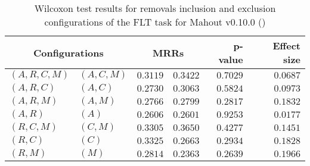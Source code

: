
\begin{table}
\begin{spacing}{1.2}
\centering
\caption{Wilcoxon test results for removals inclusion and exclusion configurations of the FLT task for Mahout v0.10.0 (\ctwo)}
\label{table:versus-wilcox-mahout-flt-removals}
\begin{tabular}{ll|rr|rr}
\toprule
      \multicolumn{2}{c|}{Configurations} &                \multicolumn{2}{c|}{MRRs} &             p-value & Effect size \\
\midrule
 $(A,R,C,M)$ &  $(A,C,M)$ &       $0.3119$ &  $\bm{0.3422}$ & $0.7029$ &    $0.0687$ \\
   $(A,R,C)$ &    $(A,C)$ &       $0.2730$ &  $\bm{0.3063}$ & $0.5824$ &    $0.0973$ \\
   $(A,R,M)$ &    $(A,M)$ &       $0.2766$ &  $\bm{0.2799}$ & $0.2817$ &    $0.1832$ \\
     $(A,R)$ &      $(A)$ &  $\bm{0.2606}$ &       $0.2601$ & $0.9253$ &    $0.0177$ \\
   $(R,C,M)$ &    $(C,M)$ &       $0.3305$ &  $\bm{0.3650}$ & $0.4277$ &    $0.1451$ \\
     $(R,C)$ &      $(C)$ &  $\bm{0.3325}$ &       $0.2663$ & $0.2934$ &    $0.1828$ \\
     $(R,M)$ &      $(M)$ &  $\bm{0.2814}$ &       $0.2363$ & $0.2639$ &    $0.1966$ \\
\bottomrule
\end{tabular}

\end{spacing}
\end{table}

